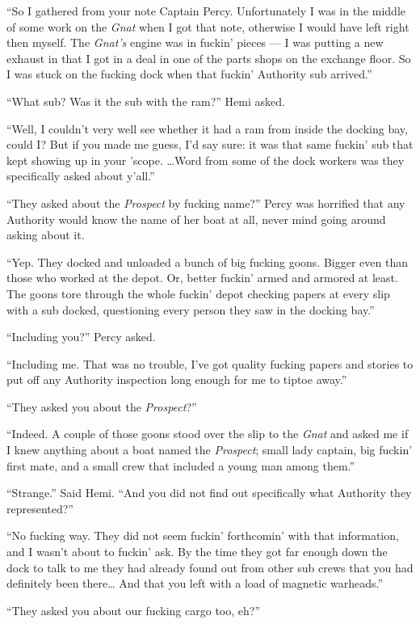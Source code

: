 \documentclass[]{scrbook}
\begin{document}
``So I gathered from your note Captain Percy. Unfortunately I was in the
middle of some work on the \emph{Gnat} when I got that note, otherwise I
would have left right then myself. The \emph{Gnat's} engine was in
fuckin' pieces --- I was putting a new exhaust in that I got in a deal
in one of the parts shops on the exchange floor. So I was stuck on the
fucking dock when that fuckin' Authority sub arrived.''

``What sub? Was it the sub with the ram?'' Hemi asked.

``Well, I couldn't very well see whether it had a ram from inside the
docking bay, could I? But if you made me guess, I'd say sure: it was
that same fuckin' sub that kept showing up in your 'scope. \ldots{}Word
from some of the dock workers was they specifically asked about y'all.''

``They asked about the \emph{Prospect} by fucking name?'' Percy was
horrified that any Authority would know the name of her boat at all,
never mind going around asking about it.

``Yep. They docked and unloaded a bunch of big fucking goons. Bigger
even than those who worked at the depot. Or, better fuckin' armed and
armored at least. The goons tore through the whole fuckin' depot
checking papers at every slip with a sub docked, questioning every
person they saw in the docking bay.''

``Including you?'' Percy asked.

``Including me. That was no trouble, I've got quality fucking papers and
stories to put off any Authority inspection long enough for me to tiptoe
away.''

``They asked you about the \emph{Prospect}?''

``Indeed. A couple of those goons stood over the slip to the \emph{Gnat}
and asked me if I knew anything about a boat named the \emph{Prospect};
small lady captain, big fuckin' first mate, and a small crew that
included a young man among them.''

``Strange.'' Said Hemi. ``And you did not find out specifically what
Authority they represented?''

``No fucking way. They did not seem fuckin' forthcomin' with that
information, and I wasn't about to fuckin' ask. By the time they got far
enough down the dock to talk to me they had already found out from other
sub crews that you had definitely been there\ldots{} And that you left
with a load of magnetic warheads.''

``They asked you about our fucking cargo too, eh?''
\end{document}
